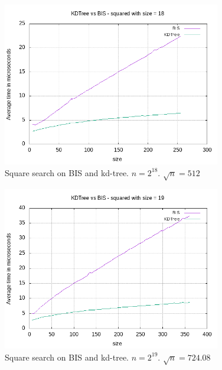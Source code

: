 \begin{figure}[h]
    \centering
    \includegraphics[width = 0.85\textwidth]{pictures/analysis/sqrt_18.png}
    \caption{Square search on BIS and kd-tree. $n=2^{18}$. $\sqrt{n} = 512$}\label{fig:sqrt_18}
\end{figure}

\begin{figure}[h]
    \centering
    \includegraphics[width = 0.85\textwidth]{pictures/analysis/sqrt_19.png}
    \caption{Square search on BIS and kd-tree. $n=2^{19}$. $\sqrt{n} = 724.08$}\label{fig:sqrt_19}
\end{figure}

